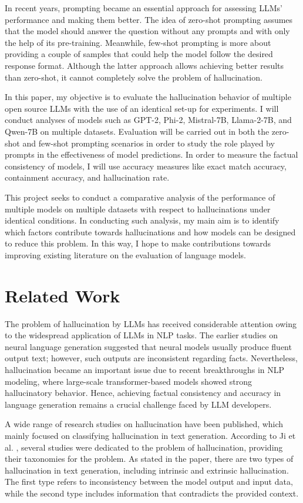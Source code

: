 \documentclass[sigconf,nonacm]{acmart}
\begin{document}
In recent years, prompting became an essential approach for assessing LLMs' performance and making them better. The idea of zero-shot prompting assumes that the model should answer the question without any prompts and with only the help of its pre-training. Meanwhile, few-shot prompting is more about providing a couple of samples that could help the model follow the desired response format. Although the latter approach allows achieving better results than zero-shot, it cannot completely solve the problem of hallucination.

In this paper, my objective is to evaluate the hallucination behavior of multiple open source LLMs with the use of an identical set-up for experiments. I will conduct analyses of models such as GPT-2, Phi-2, Mistral-7B, Llama-2-7B, and Qwen-7B on multiple datasets. Evaluation will be carried out in both the zero-shot and few-shot prompting scenarios in order to study the role played by prompts in the effectiveness of model predictions. In order to measure the factual consistency of models, I will use accuracy measures like exact match accuracy, containment accuracy, and hallucination rate.

This project seeks to conduct a comparative analysis of the performance of multiple models on multiple datasets with respect to hallucinations under identical conditions. In conducting such analysis, my main aim is to identify which factors contribute towards hallucinations and how models can be designed to reduce this problem. In this way, I hope to make contributions towards improving existing literature on the evaluation of language models.

\section{Related Work}

The problem of hallucination by LLMs has received considerable attention owing to the widespread application of LLMs in NLP tasks. The earlier studies on neural language generation suggested that neural models usually produce fluent output text; however, such outputs are inconsistent regarding facts. Nevertheless, hallucination became an important issue due to recent breakthroughs in NLP modeling, where large-scale transformer-based models showed strong hallucinatory behavior. Hence, achieving factual consistency and accuracy in language generation remains a crucial challenge faced by LLM developers.

A wide range of research studies on hallucination have been published, which mainly focused on classifying hallucination in text generation. According to Ji et al. \cite{ji2023survey}, several studies were dedicated to the problem of hallucination, providing their taxonomies for the problem. As stated in the paper, there are two types of hallucination in text generation, including intrinsic and extrinsic hallucination. The first type refers to inconsistency between the model output and input data, while the second type includes information that contradicts the provided context.
\end{document}

